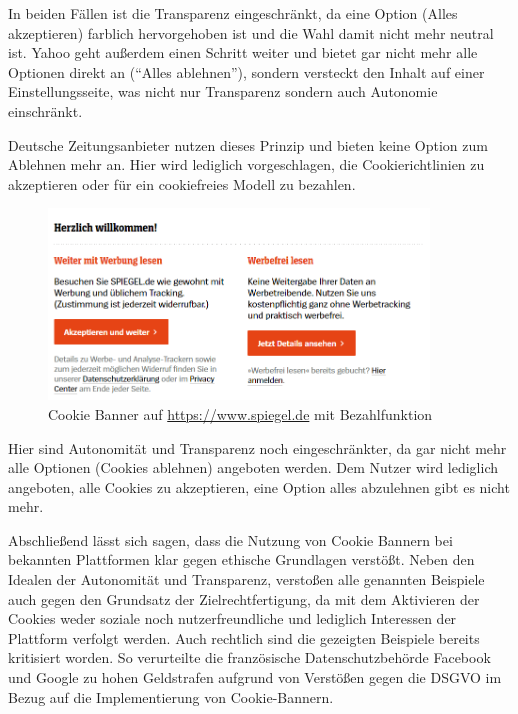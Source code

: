 In beiden Fällen ist die Transparenz eingeschränkt, da eine Option (Alles akzeptieren) farblich hervorgehoben ist und die Wahl damit nicht mehr neutral ist. Yahoo geht außerdem einen Schritt weiter und bietet gar nicht mehr alle Optionen direkt an (``Alles ablehnen''), sondern versteckt den Inhalt auf einer Einstellungsseite, was nicht nur Transparenz sondern auch Autonomie einschränkt.

Deutsche Zeitungsanbieter nutzen dieses Prinzip und bieten keine Option zum Ablehnen mehr an. Hier wird lediglich vorgeschlagen, die Cookierichtlinien zu akzeptieren oder für ein cookiefreies Modell zu bezahlen.

\begin{figure}
    \centering
    \includegraphics[width=0.9\textwidth]{Bilder/Spiegel_Banner.png}
    \caption{Cookie Banner auf \url{https://www.spiegel.de} mit Bezahlfunktion}
    \label{fig:Spiegel-Cookie}
\end{figure}

Hier sind Autonomität und Transparenz noch eingeschränkter, da gar nicht mehr alle Optionen (Cookies ablehnen) angeboten werden. Dem Nutzer wird lediglich angeboten, alle Cookies zu akzeptieren, eine Option alles abzulehnen gibt es nicht mehr.

Abschließend lässt sich sagen, dass die Nutzung von Cookie Bannern bei bekannten Plattformen klar gegen ethische Grundlagen verstößt. Neben den Idealen der Autonomität und Transparenz, verstoßen alle genannten Beispiele auch gegen den Grundsatz der Zielrechtfertigung, da mit dem Aktivieren der Cookies weder soziale noch nutzerfreundliche und lediglich Interessen der Plattform verfolgt werden. Auch rechtlich sind die gezeigten Beispiele bereits kritisiert worden. So verurteilte die französische Datenschutzbehörde Facebook und Google zu hohen Geldstrafen aufgrund von Verstößen gegen die DSGVO im Bezug auf die Implementierung von Cookie-Bannern. \parencite{AnnaBiselli.2022}